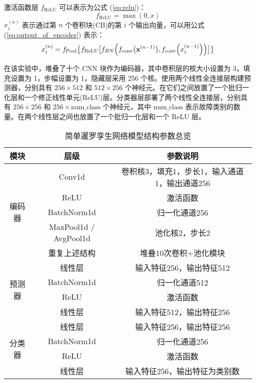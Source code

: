 \documentclass[master]{thesis-uestc}
\begin{document}
激活函数层 \( f_{\text{ReLU}} \) 可以表示为公式 (\ref{eq:relu})：
\begin{equation}
    f_{\text{ReLU}} = \max(0, x)
    \label{eq:relu}
\end{equation}
\( x_i^{(n)} \) 表示通过第 \( n \) 个卷积块(CB)的第 \( i \) 个输出向量，可以用公式 (\ref{eq:output_of_encoder}) 表示：
\begin{equation}
    \begin{aligned}
    x_i^{(n)} = f_{\text{Pool}}\bigl\{f_{\text{ReLU}}\bigl[f_{BN}\Bigl(f_{\text{conv}}\bigl(\mathbf{x}^{(n-1)}\bigr), f_{\text{conv}}\Bigl(x_i^{(n-1)}\Bigr)\Bigr)\bigr]\bigr\}
    \end{aligned}
    \label{eq:output_of_encoder}
\end{equation}

在该实验中，堆叠了十个 CNN 块作为编码器，其中卷积层的核大小设置为 3，填充设置为 1，步幅设置为 1，隐藏层采用 256 个核。使用两个线性全连接层构建预测器，分别具有 \( 256 \times 512 \) 和 \( 512 \times 256 \) 个神经元。在它们之间放置了一个批归一化层和一个修正线性单元(ReLU)层。分类器层部署了两个线性全连接层，分别具有 \( 256 \times 256 \) 和 \( 256 \times \text{num\_class} \) 个神经元，其中 \(\text{num\_class}\) 表示故障类别的数量。在两个线性层之间也放置了一个批归一化层和一个 ReLU 层。

\begin{table}[h]
\centering
\caption{简单暹罗孪生网络模型结构参数总览}
\renewcommand\arraystretch{1.2}
\begin{tabular}{c c c}
\toprule
模块 & 层级 & 参数说明 \\
\midrule
\multirow{5}{*}{编码器} 
& Conv1d & 卷积核3，填充1，步长1，输入通道1，输出通道256 \\
& ReLU & 激活函数 \\
& BatchNorm1d & 归一化通道256 \\
& MaxPool1d / AvgPool1d & 池化核2，步长2 \\
& 重复上述结构 & 堆叠10次卷积+池化模块 \\
\midrule
\multirow{4}{*}{预测器} 
& 线性层 & 输入特征256，输出特征512 \\
& BatchNorm1d & 归一化通道512 \\
& ReLU & 激活函数 \\
& 线性层 & 输入特征512，输出特征256 \\
\midrule
\multirow{4}{*}{分类器} 
& 线性层 & 输入特征256，输出特征256 \\
& BatchNorm1d & 归一化通道256 \\
& ReLU & 激活函数 \\
& 线性层 & 输入特征256，输出特征为类别数 \\
\bottomrule
\end{tabular}
\label{tab:simsiam_para}
\end{table}
\end{document}
